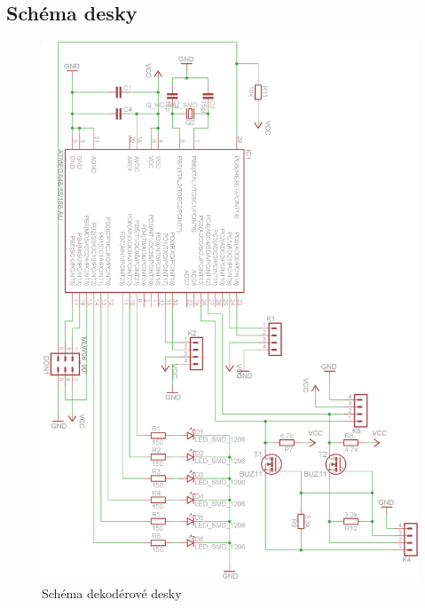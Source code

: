 \documentclass[a4paper,11pt]{article}
\begin{document}
\newpage
\subsection{Schéma desky}
\begin{figure}[h]
	\centering
		\includegraphics[scale=0.8]{dekoderySchema.png}
	\caption{Schéma dekodérové desky}
	\label{fig:dekoderySchema}
\end{figure}
\end{document}
